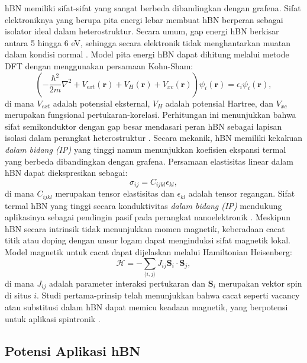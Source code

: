 hBN memiliki sifat-sifat yang sangat berbeda dibandingkan dengan grafena. Sifat elektroniknya yang berupa pita energi lebar membuat hBN berperan sebagai isolator ideal dalam heterostruktur. Secara umum, gap energi hBN berkisar antara 5 hingga 6 eV, sehingga secara elektronik tidak menghantarkan muatan dalam kondisi normal \citep{Zhang2020}. Model pita energi hBN dapat dihitung melalui metode DFT dengan menggunakan persamaan Kohn-Sham:
\begin{equation}
    \left(-\frac{\hbar^2}{2m}\nabla^2 + V_{ext}(\mathbf{r}) + V_H(\mathbf{r}) + V_{xc}(\mathbf{r})\right)\psi_i(\mathbf{r}) = \epsilon_i \psi_i(\mathbf{r}),
\end{equation}
di mana \(V_{ext}\) adalah potensial eksternal, \(V_H\) adalah potensial Hartree, dan \(V_{xc}\) merupakan fungsional pertukaran-korelasi. Perhitungan ini menunjukkan bahwa sifat semikonduktor dengan gap besar mendasari peran hBN sebagai lapisan isolasi dalam perangkat heterostruktur \citep{Zhang2020}. Secara mekanik, hBN memiliki kekakuan \emph{dalam bidang (IP)} yang tinggi namun menunjukkan koefisien ekspansi termal yang berbeda dibandingkan dengan grafena. Persamaan elastisitas linear dalam hBN dapat diekspresikan sebagai:
\begin{equation}
    \sigma_{ij} = C_{ijkl}\epsilon_{kl},
\end{equation}
di mana \(C_{ijkl}\) merupakan tensor elastisitas dan \(\epsilon_{kl}\) adalah tensor regangan. Sifat termal hBN yang tinggi secara konduktivitas \emph{dalam bidang (IP)} mendukung aplikasinya sebagai pendingin pasif pada perangkat nanoelektronik \citep{Zhang2020}. Meskipun hBN secara intrinsik tidak menunjukkan momen magnetik, keberadaan cacat titik atau doping dengan unsur logam dapat menginduksi sifat magnetik lokal. Model magnetik untuk cacat dapat dijelaskan melalui Hamiltonian Heisenberg:
\begin{equation}
    \mathcal{H} = -\sum_{\langle i,j \rangle} J_{ij} \mathbf{S}_i \cdot \mathbf{S}_j,
\end{equation}
di mana \(J_{ij}\) adalah parameter interaksi pertukaran dan \(\mathbf{S}_i\) merupakan vektor spin di situs \(i\). Studi pertama-prinsip telah menunjukkan bahwa cacat seperti vacancy atau substitusi dalam hBN dapat memicu keadaan magnetik, yang berpotensi untuk aplikasi spintronik \citep{Zhang2020}. \subsection{Potensi Aplikasi hBN}
